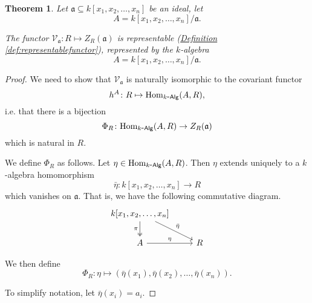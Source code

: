 \documentclass[a4paper,10pt]{scrreprt}
\newcommand{\Hom}{\mathrm{Hom}}
\def\mhyp{{\hbox{-}}}
\theoremstyle{definition}
\theoremstyle{plain}
\newtheorem{theorem}{Theorem}[section]
\theoremstyle{remark}
\begin{document}
\begin{theorem}
  Let $\mathfrak{a} \subseteq k[x_{1}, x_{2}, \ldots, x_{n}]$ be an ideal, let
  \begin{equation*}
    A = k[x_{1}, x_{2}, \ldots, x_{n}]/\mathfrak{a}.
  \end{equation*}

  The functor $\mathcal{V}_{\mathfrak{a}}\colon R \mapsto Z_{R}(\mathfrak{a})$ is representable (\hyperref[def:representablefunctor]{Definition \ref*{def:representablefunctor}}), represented by the $k$-algebra 
  \begin{equation*}
    A = k[x_{1}, x_{2}, \ldots, x_{n}]/\mathfrak{a}.
  \end{equation*}
\end{theorem}
\begin{proof}
  We need to show that $\mathcal{V}_{\mathfrak{a}}$ is naturally isomorphic to the covariant functor
  \begin{equation*}
    h^{A}\colon R \mapsto \Hom_{k\mhyp\mathsf{Alg}}(A, R),
  \end{equation*}
  i.e. that there is a bijection
  \begin{equation*}
    \Phi_{R}\colon \Hom_{k\mhyp\mathsf{Alg}}(A, R) \to Z_{R}(\mathfrak{a})
  \end{equation*}
  which is natural in $R$.

  We define $\Phi_{R}$ as follows. Let $\eta\in \Hom_{k\mhyp\mathsf{Alg}}(A, R)$. Then $\eta$ extends uniquely to a $k$-algebra homomorphism 
  \begin{equation*}
    \bar{\eta}\colon k[x_{1}, x_{2}, \ldots, x_{n}] \to R
  \end{equation*}
  which vanishes on $\mathfrak{a}$. That is, we have the following commutative diagram.
  \begin{equation*}
    \begin{tikzcd}
      k[x_{1}, x_{2}, \ldots, x_{n}]
      \arrow[d, twoheadrightarrow, swap, "\pi"]
      \arrow[dr, "\bar{\eta}"]
      \\
      A
      \arrow[r, "\eta"]
      & R
    \end{tikzcd}
  \end{equation*}

  We then define
  \begin{equation*}
    \Phi_{R}\colon \eta \mapsto (\bar{\eta}(x_{1}), \bar{\eta}(x_{2}), \ldots, \bar{\eta}(x_{n})).
  \end{equation*}

  To simplify notation, let $\bar{\eta}(x_{i}) = a_{i}$.


\end{proof}
\end{document}
